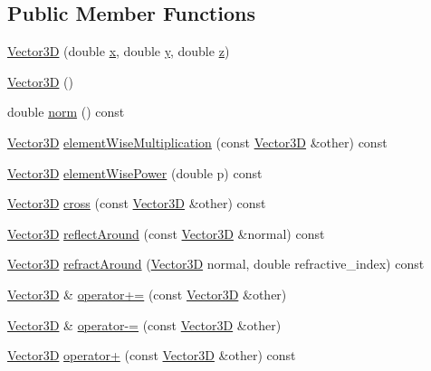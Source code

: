 \subsection*{Public Member Functions}
\begin{DoxyCompactItemize}
\item 
\hyperlink{classVector3D_abd851542da40b1168edcad11fa83b7c2}{Vector3D} (double \hyperlink{classVector3D_a3c086dfccfc57dd996e9b8600098a430}{x}, double \hyperlink{classVector3D_adcec384756103d26d1181e45d5a0fd78}{y}, double \hyperlink{classVector3D_a7321f3ff785f275c4d83f7d1b951752a}{z})
\item 
\hyperlink{classVector3D_a0b11a8d75da427b27443d8a94d0d296c}{Vector3D} ()
\item 
double \hyperlink{classVector3D_ae07836fc4e7a4d9de5729caa3d8acc2c}{norm} () const 
\item 
\hyperlink{classVector3D}{Vector3D} \hyperlink{classVector3D_a09c6373726d31a7263d2f62184758f11}{element\+Wise\+Multiplication} (const \hyperlink{classVector3D}{Vector3D} \&other) const 
\item 
\hyperlink{classVector3D}{Vector3D} \hyperlink{classVector3D_ac893b27cda588514e65f2693eb72467c}{element\+Wise\+Power} (double p) const 
\item 
\hyperlink{classVector3D}{Vector3D} \hyperlink{classVector3D_a81310eb5d5bd8d28feff3daf6abae149}{cross} (const \hyperlink{classVector3D}{Vector3D} \&other) const 
\item 
\hyperlink{classVector3D}{Vector3D} \hyperlink{classVector3D_aa29c8639f4cf9515821a1fc12fb74648}{reflect\+Around} (const \hyperlink{classVector3D}{Vector3D} \&normal) const 
\item 
\hyperlink{classVector3D}{Vector3D} \hyperlink{classVector3D_a7fabd6f9459f6a6dda863777d81bd525}{refract\+Around} (\hyperlink{classVector3D}{Vector3D} normal, double refractive\+\_\+index) const 
\item 
\hyperlink{classVector3D}{Vector3D} \& \hyperlink{classVector3D_a546241ecc51e49e05e7672ffde26bbf8}{operator+=} (const \hyperlink{classVector3D}{Vector3D} \&other)
\item 
\hyperlink{classVector3D}{Vector3D} \& \hyperlink{classVector3D_a799f712590c47cc435b929718586555c}{operator-\/=} (const \hyperlink{classVector3D}{Vector3D} \&other)
\item 
\hyperlink{classVector3D}{Vector3D} \hyperlink{classVector3D_a4f42a873d7f7bea9d2436bedb44baa94}{operator+} (const \hyperlink{classVector3D}{Vector3D} \&other) const 
\item 

\end{DoxyCompactItemize}
